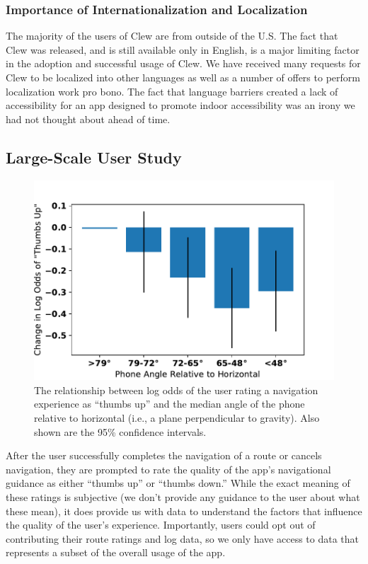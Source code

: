 \documentclass[chi_draft]{sigchi}
\begin{document}
\subsubsection{Importance of Internationalization and Localization}

The majority of the users of Clew are from outside of the U.S.  The fact that Clew was released, and is still available only in English, is a major limiting factor in the adoption and successful usage of Clew.  We have received many requests for Clew to be localized into other languages as well as a number of offers to perform localization work pro bono.  The fact that language barriers created a lack of accessibility for an app designed to promote indoor accessibility was an irony we had not thought about ahead of time.

\subsection{Large-Scale User Study}\label{sec:largescalestudy}
\begin{figure}
\includegraphics[width=\linewidth]{figures/phoneangle}
\caption{The relationship between log odds of the user rating a navigation experience as ``thumbs up'' and the median angle of the phone relative to horizontal (i.e., a plane perpendicular to gravity).  Also shown are the 95\% confidence intervals.\label{fig:devicepose}}
\end{figure}

After the user successfully completes the navigation of a route or cancels navigation, they are prompted to rate the quality of the app's navigational guidance as either ``thumbs up'' or ``thumbs down.''   While the exact meaning of these ratings is subjective (we don't provide any guidance to the user about what these mean), it does provide us with data to understand the factors that influence the quality of the user's experience.  Importantly, users could opt out of contributing their route ratings and log data, so we only have access to data that represents a subset of the overall usage of the app.
\end{document}
